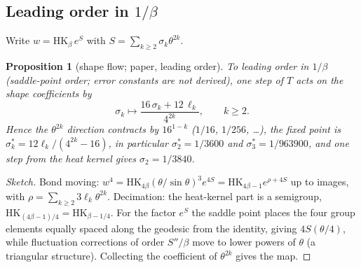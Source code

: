 \documentclass[11pt,a4paper]{article}
\newtheorem{proposition}[theorem]{Proposition}
\theoremstyle{definition}
\theoremstyle{remark}
\newcommand{\HK}{\mathrm{HK}}
\begin{document}
\subsection{\texorpdfstring{Leading order in $1/\beta$}{Leading order in 1/beta}}
Write $w=\HK_\beta\,e^{S}$ with $S=\sum_{k\ge2}\sigma_k\theta^{2k}$.

\begin{proposition}[shape flow; paper, leading order]\label{prop:shape}
To leading order in $1/\beta$ (saddle-point order; error constants are not derived), one step of $T$ acts on the shape coefficients by
\[
\sigma_k\longmapsto\frac{16\,\sigma_k+12\,\ell_k}{4^{2k}},\qquad k\ge2 .
\]
Hence the $\theta^{2k}$ direction contracts by $16^{1-k}$ ($1/16$, $1/256$, \dots), the fixed point is $\sigma_k^*=12\ell_k/(4^{2k}-16)$, in particular $\sigma_2^*=1/3600$ and $\sigma_3^*=1/963900$, and one step from the heat kernel gives $\sigma_2=1/3840$.
\end{proposition}
\begin{proof}[Sketch]
Bond moving: $w^4=\HK_{4\beta}(\theta/\sin\theta)^3e^{4S}=\HK_{4\beta-1}e^{\rho+4S}$ up to images, with $\rho=\sum_{k\ge2}3\ell_k\theta^{2k}$.
Decimation: the heat-kernel part is a semigroup, $\HK_{(4\beta-1)/4}=\HK_{\beta-1/4}$.
For the factor $e^{S}$ the saddle point places the four group elements equally spaced along the geodesic from the identity, giving $4S(\theta/4)$, while fluctuation corrections of order $S''/\beta$ move to lower powers of $\theta$ (a triangular structure).
Collecting the coefficient of $\theta^{2k}$ gives the map.
\end{proof}
\end{document}
